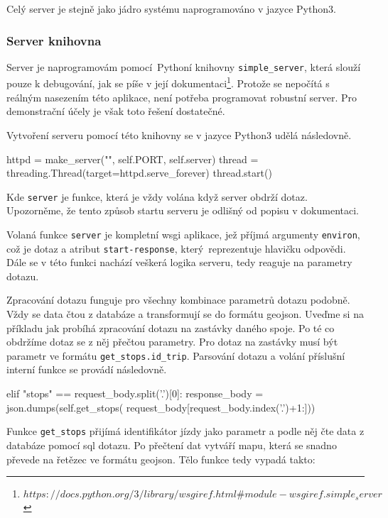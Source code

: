 Celý server je stejně jako jádro systému naprogramováno v jazyce Python3.

\subsubsection{Server knihovna}

Server je naprogramovám pomocí Pythoní knihovny \verb-simple_server-, která slouží pouze k debugování, jak se píše v její dokumentaci\footnote{$https://docs.python.org/3/library/wsgiref.html\#module-wsgiref.simple_server$}. Protože se nepočítá s reálným nasezením této aplikace, není potřeba programovat robustní server. Pro demonstrační účely je však toto řešení dostatečné.

\bigbreak

Vytvoření serveru pomocí této knihovny se v jazyce Python3 udělá následovně.

\begin{code}[frame=none]
httpd = make_server("", self.PORT, self.server)
thread = threading.Thread(target=httpd.serve_forever)
thread.start()
\end{code}

Kde \verb-server- je funkce, která je vždy volána když server obdrží dotaz. Upozorněme, že tento způsob startu serveru je odlišný od popisu v dokumentaci.

\bigbreak

Volaná funkce \verb-server- je kompletní \gls{wsgi} aplikace, jež příjmá argumenty \verb-environ-, což je dotaz a atribut \verb:start-response:, který reprezentuje hlavičku odpovědi. Dále se v této funkci nachází veškerá logika serveru, tedy reaguje na parametry dotazu.

\bigbreak

Zpracování dotazu funguje pro všechny kombinace parametrů dotazu podobně. Vždy se data čtou z databáze a transformují se do formátu \gls{geojson}. Uveďme si na příkladu jak probíhá zpracování dotazu na zastávky daného spoje. Po té co obdržíme dotaz se z něj přečtou parametry. Pro dotaz na zastávky musí být parametr ve formátu \verb-get_stops.id_trip-. Parsování dotazu a volání příslušní interní funkce se provádí následovně.

\begin{code}[frame=none]
elif "stops" == request_body.split('.')[0]:
  response_body = json.dumps(self.get_stops(
    request_body[request_body.index('.')+1:]))
\end{code}

Funkce \verb-get_stops- přijímá identifikátor jízdy jako parametr a podle něj čte data z databáze pomocí \gls{sql} dotazu. Po přečtení dat vytváří mapu, která se snadno převede na řetězec ve formátu \gls{geojson}. Tělo funkce tedy vypadá takto:

